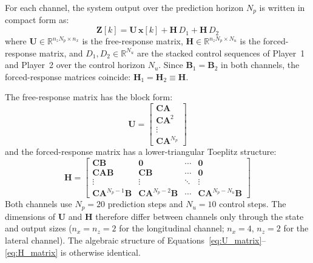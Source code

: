 \documentclass[12pt,a4paper,oneside]{report}
\begin{document}
For each channel, the system output over the prediction horizon $N_p$ is written in compact form as:
\begin{equation}
\mathbf{Z}[k] = \mathbf{U} \, \mathbf{x}[k] + \mathbf{H} \, D_1 + \mathbf{H} \, D_2
\label{eq:compact_prediction}
\end{equation}
where $\mathbf{U} \in \mathbb{R}^{n_z N_p \times n_x}$ is the free-response matrix, $\mathbf{H} \in \mathbb{R}^{n_z N_p \times N_u}$ is the forced-response matrix, and $D_1, D_2 \in \mathbb{R}^{N_u}$ are the stacked control sequences of Player~1 and Player~2 over the control horizon $N_u$. Since $\mathbf{B}_1 = \mathbf{B}_2$ in both channels, the forced-response matrices coincide: $\mathbf{H}_1 = \mathbf{H}_2 \equiv \mathbf{H}$.

The free-response matrix has the block form:
\begin{equation}
\mathbf{U} = \begin{bmatrix} \mathbf{C} \mathbf{A} \\ \mathbf{C} \mathbf{A}^2 \\ \vdots \\ \mathbf{C} \mathbf{A}^{N_p} \end{bmatrix}
\label{eq:U_matrix}
\end{equation}
and the forced-response matrix has a lower-triangular Toeplitz structure:
\begin{equation}
\mathbf{H} = \begin{bmatrix}
\mathbf{C} \mathbf{B} & \mathbf{0} & \cdots & \mathbf{0} \\
\mathbf{C} \mathbf{A} \mathbf{B} & \mathbf{C} \mathbf{B} & \cdots & \mathbf{0} \\
\vdots & \vdots & \ddots & \vdots \\
\mathbf{C} \mathbf{A}^{N_p-1} \mathbf{B} & \mathbf{C} \mathbf{A}^{N_p-2} \mathbf{B} & \cdots & \mathbf{C} \mathbf{A}^{N_p-N_u} \mathbf{B}
\end{bmatrix}
\label{eq:H_matrix}
\end{equation}
Both channels use $N_p = 20$ prediction steps and $N_u = 10$ control steps. The dimensions of $\mathbf{U}$ and $\mathbf{H}$ therefore differ between channels only through the state and output sizes ($n_x = n_z = 2$ for the longitudinal channel; $n_x = 4$, $n_z = 2$ for the lateral channel). The algebraic structure of Equations~\eqref{eq:U_matrix}--\eqref{eq:H_matrix} is otherwise identical.

\end{document}
